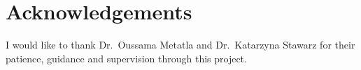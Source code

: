 
\section*{Acknowledgements}
I would like to thank Dr.~Oussama Metatla and Dr.~Katarzyna Stawarz for their patience, guidance and supervision through this project.
